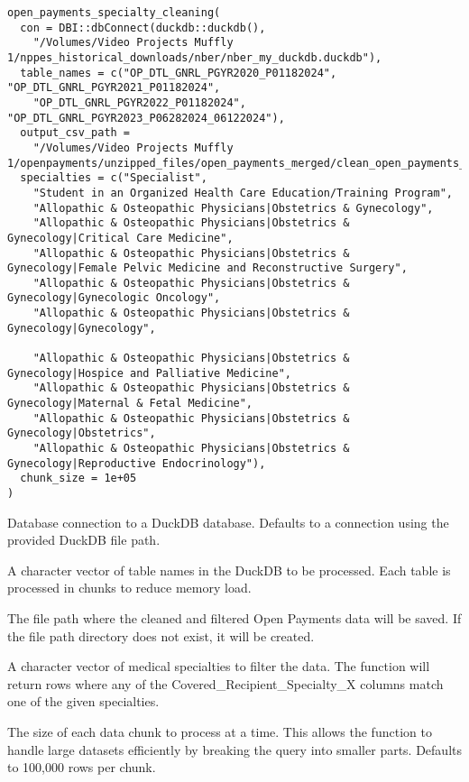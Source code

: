 \documentclass[a4paper]{book}
\begin{document}
%
\begin{Usage}
\begin{verbatim}
open_payments_specialty_cleaning(
  con = DBI::dbConnect(duckdb::duckdb(),
    "/Volumes/Video Projects Muffly 1/nppes_historical_downloads/nber/nber_my_duckdb.duckdb"),
  table_names = c("OP_DTL_GNRL_PGYR2020_P01182024", "OP_DTL_GNRL_PGYR2021_P01182024",
    "OP_DTL_GNRL_PGYR2022_P01182024", "OP_DTL_GNRL_PGYR2023_P06282024_06122024"),
  output_csv_path =
    "/Volumes/Video Projects Muffly 1/openpayments/unzipped_files/open_payments_merged/clean_open_payments_specialty.csv",
  specialties = c("Specialist",
    "Student in an Organized Health Care Education/Training Program",
    "Allopathic & Osteopathic Physicians|Obstetrics & Gynecology",
    "Allopathic & Osteopathic Physicians|Obstetrics & Gynecology|Critical Care Medicine",
    "Allopathic & Osteopathic Physicians|Obstetrics & Gynecology|Female Pelvic Medicine and Reconstructive Surgery",
    "Allopathic & Osteopathic Physicians|Obstetrics & Gynecology|Gynecologic Oncology",
    "Allopathic & Osteopathic Physicians|Obstetrics & Gynecology|Gynecology", 
    
    "Allopathic & Osteopathic Physicians|Obstetrics & Gynecology|Hospice and Palliative Medicine",
    "Allopathic & Osteopathic Physicians|Obstetrics & Gynecology|Maternal & Fetal Medicine",
    "Allopathic & Osteopathic Physicians|Obstetrics & Gynecology|Obstetrics",
    "Allopathic & Osteopathic Physicians|Obstetrics & Gynecology|Reproductive Endocrinology"),
  chunk_size = 1e+05
)
\end{verbatim}
\end{Usage}
%
\begin{Arguments}
\begin{ldescription}
\item[\code{con}] Database connection to a DuckDB database. Defaults to a connection using the provided DuckDB file path.

\item[\code{table\_names}] A character vector of table names in the DuckDB to be processed. Each table is processed in chunks to reduce memory load.

\item[\code{output\_csv\_path}] The file path where the cleaned and filtered Open Payments data will be saved. If the file path directory does not exist, it will be created.

\item[\code{specialties}] A character vector of medical specialties to filter the data. The function will return rows where any of the Covered\_Recipient\_Specialty\_X columns match one of the given specialties.

\item[\code{chunk\_size}] The size of each data chunk to process at a time. This allows the function to handle large datasets efficiently by breaking the query into smaller parts. Defaults to 100,000 rows per chunk.
\end{ldescription}
\end{Arguments}
\end{document}
